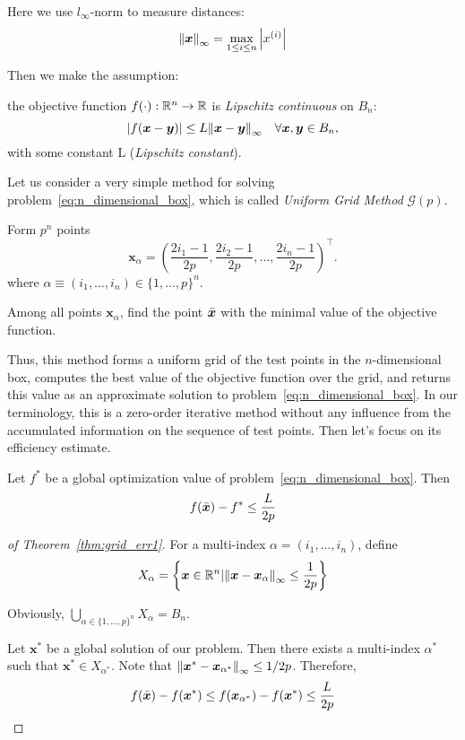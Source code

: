 Here we use \(l_\infty\)-norm to measure distances:
\[
    \norm{\bm{x}}_{\infty} = \max_{1 \le i \le n} \abs{x^{(i)}}  
\]

Then we make the assumption:
\begin{assum}\label{assum:lipschitz_objective_func}
    the objective function \(f(\cdot): \mathbb{R}^n \to \mathbb{R}\) is \emph{Lipschitz continuous} on \(B_n\):
    \[
        \abs{f(\bm{x} - \bm{y})} \le L \norm{\bm{x} - \bm{y}}_{\infty} \quad \forall \bm{x},\bm{y} \in B_n,
    \]
    with some constant L (\emph{Lipschitz constant}).
\end{assum}

Let us consider a very simple method for solving problem~\ref{eq:n_dimensional_box}, 
which is called \emph{Uniform Grid Method} \(\mathscr{G}(p)\).
\begin{algorithm}[!htbp]
\caption{Uniform Grid Method \(\mathscr{G}(p)\)}\label{alg:uniform_grid_method}
    Form \(p^n\) points
    \[
        \bm{x}_\alpha = \left( \frac{2i_1 - 1}{2p}, \frac{2i_2 - 1}{2p}, \dots, \frac{2i_n - 1}{2p} \right)^\top.  
    \]
    where \(\alpha \equiv (i_1, \dots, i_n) \in \{1, \dots, p\}^n\).
    
    Among all points \(\bm{x}_\alpha\), find the point \(\bar{\bm{x}}\) with the minimal value of the objective function.
\end{algorithm}

Thus, this method forms a uniform grid of the test points in the \(n\)-dimensional box, 
computes the best value of the objective function over the grid, and returns this value 
as an approximate solution to problem~\ref{eq:n_dimensional_box}. In our terminology, 
this is a zero-order iterative method without any influence from the accumulated information 
on the sequence of test points. Then let's focus on its efficiency estimate.

\begin{thm}\label{thm:grid_err1}
    Let \(f^*\) be a global optimization value of problem~\ref{eq:n_dimensional_box}. Then
    \[
        f(\bar{\bm{x}}) - f^* \le \frac{L}{2p}  
    \]
\end{thm}

\begin{proof}[of Theorem~\ref{thm:grid_err1}]
    For a multi-index \(\alpha = (i_1, \dots, i_n)\), define
    \[
        X_\alpha = \left\{ \bm{x} \in \mathbb{R}^n \arrowvert \norm{\bm{x} - \bm{x}_\alpha}_{\infty} \le \frac{1}{2p} \right\}
    \]

    Obviously, \(\bigcup_{\alpha \in \{1, \dots, p\}^n} X_\alpha = B_n\).

    Let \(\bm{x}^*\) be a global solution of our problem. Then there exists a multi-index \(\alpha^*\) 
    such that \(\bm{x}^* \in X_{\alpha^*}\). Note that \(\norm{\bm{x}^* - \bm{x}_{\alpha^*}}_{\infty} \le 1/2p\). 
    Therefore,
    \[
        f(\bar{\bm{x}}) - f(\bm{x}^*) \le f(\bm{x}_{\alpha^*}) - f(\bm{x}^*) \le \frac{L}{2p}
    \]
\end{proof}

